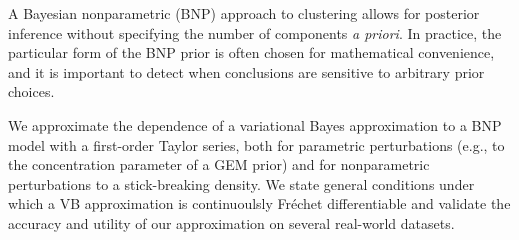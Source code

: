A Bayesian nonparametric (BNP) approach to clustering allows for posterior
inference without specifying the number of components {\em a priori}.  In
practice, the particular form of the BNP prior is often chosen for mathematical
convenience, and it is important to detect when conclusions are sensitive to
arbitrary prior choices.

We approximate the dependence of a variational Bayes approximation to a BNP
model with a first-order Taylor series, both for parametric perturbations (e.g.,
to the concentration parameter of a GEM prior) and for nonparametric
perturbations to a stick-breaking density.  We state general conditions under
which a VB approximation is continuoulsly Fr{\'e}chet differentiable and
validate the accuracy and utility of our approximation on several real-world
datasets.
